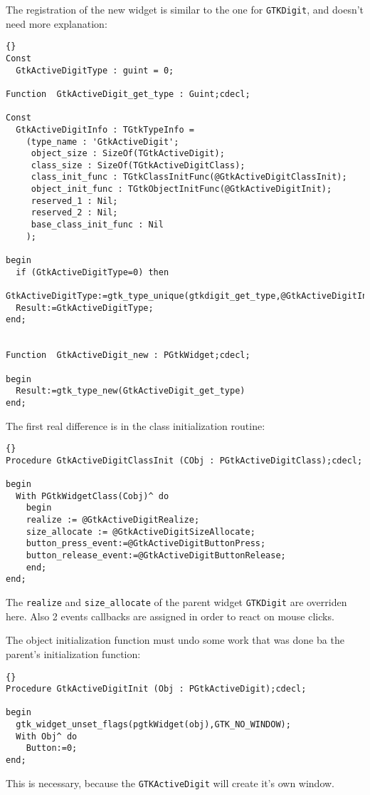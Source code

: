\documentclass[10pt]{article}
\begin{document}
The registration of the new widget is similar to the one for
\lstinline|GTKDigit|, and doesn't need more explanation:
\begin{lstlisting}{}
Const
  GtkActiveDigitType : guint = 0;

Function  GtkActiveDigit_get_type : Guint;cdecl;

Const 
  GtkActiveDigitInfo : TGtkTypeInfo = 
    (type_name : 'GtkActiveDigit';
     object_size : SizeOf(TGtkActiveDigit);
     class_size : SizeOf(TGtkActiveDigitClass);
     class_init_func : TGtkClassInitFunc(@GtkActiveDigitClassInit);
     object_init_func : TGtkObjectInitFunc(@GtkActiveDigitInit);
     reserved_1 : Nil;
     reserved_2 : Nil;
     base_class_init_func : Nil
    );

begin
  if (GtkActiveDigitType=0) then
    GtkActiveDigitType:=gtk_type_unique(gtkdigit_get_type,@GtkActiveDigitInfo);
  Result:=GtkActiveDigitType;  
end;


Function  GtkActiveDigit_new : PGtkWidget;cdecl;

begin
  Result:=gtk_type_new(GtkActiveDigit_get_type)  
end;
\end{lstlisting}
The first real difference is in the class initialization routine:
\begin{lstlisting}{}
Procedure GtkActiveDigitClassInit (CObj : PGtkActiveDigitClass);cdecl;

begin
  With PGtkWidgetClass(Cobj)^ do 
    begin
    realize := @GtkActiveDigitRealize;
    size_allocate := @GtkActiveDigitSizeAllocate;
    button_press_event:=@GtkActiveDigitButtonPress;
    button_release_event:=@GtkActiveDigitButtonRelease;
    end;
end;
\end{lstlisting}
The \lstinline|realize| and \lstinline|size_allocate| of the parent widget
\lstinline|GTKDigit| are overriden here. Also 2 events callbacks are
assigned in order to react on mouse clicks.

The object initialization function must undo some work that was done
ba the parent's initialization function:
\begin{lstlisting}{}
Procedure GtkActiveDigitInit (Obj : PGtkActiveDigit);cdecl;

begin
  gtk_widget_unset_flags(pgtkWidget(obj),GTK_NO_WINDOW);
  With Obj^ do
    Button:=0;
end;
\end{lstlisting}
This is necessary, because the \lstinline|GTKActiveDigit| will create it's
own window.
\end{document}
